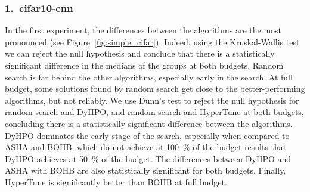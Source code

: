 


%

%

%
%        
%

\subsubsection{1.\ cifar10-cnn}
In the first experiment, the differences between the algorithms are the most pronounced (see Figure~\ref{fig:simple_cifar}). Indeed, using the Kruskal-Wallis test we can reject the null hypothesis and conclude that there is a statistically significant difference in the medians of the groups at both budgets. Random search is far behind the other algorithms, especially early in the search. At full budget, some solutions found by random search get close to the better-performing algorithms, but not reliably. We use Dunn's test to reject the null hypothesis for random search and DyHPO, and random search and HyperTune at both budgets, concluding there is a statistically significant difference between the algorithms. DyHPO dominates the early stage of the search, especially when compared to ASHA and BOHB, which do not achieve at \SI{100}{\percent} of the budget results that DyHPO achieves at \SI{50}{\percent} of the budget. The differences between DyHPO and ASHA with BOHB are also statistically significant for both budgets. Finally, HyperTune is significantly better than BOHB at full budget.

